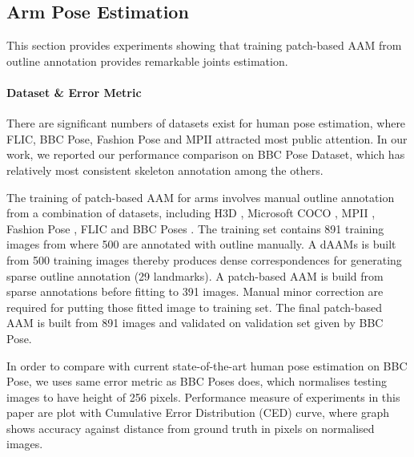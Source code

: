 \subsection{Arm Pose Estimation}
\label{exp:benchmark}
This section provides experiments showing that training patch-based AAM from outline annotation provides remarkable joints estimation.

\paragraph{Dataset \& Error Metric} There are significant numbers of datasets exist for human pose estimation, where FLIC\cite{sapp2013modec}, BBC Pose\cite{pfister2015flowing}, Fashion Pose\cite{dantone2013human} and MPII\cite{andriluka14cvpr} attracted most public attention. In our work, we reported our performance comparison on BBC Pose Dataset\cite{pfister2015flowing}, which has relatively most consistent skeleton annotation among the others.

The training of patch-based AAM for arms involves manual outline annotation from a combination of datasets, including H3D \cite{PoseletsICCV09}, Microsoft COCO \cite{lin2014microsoft}, MPII \cite{andriluka14cvpr}, Fashion Pose \cite{dantone2013human}, FLIC \cite{sapp2013modec} and BBC Poses \cite{pfister2015flowing}. The training set contains 891 training images from where 500 are annotated with outline manually. A dAAMs is built from 500 training images thereby produces dense correspondences for generating sparse outline annotation (29 landmarks). A patch-based AAM is build from sparse annotations before fitting to 391 images. Manual minor correction are required for putting those fitted image to training set. The final patch-based AAM is built from 891 images and validated on validation set given by BBC Pose.

In order to compare with current state-of-the-art human pose estimation on BBC Pose, we uses same error metric as BBC Poses does, which normalises testing images to have height of 256 pixels. Performance measure of experiments in this paper are plot with Cumulative Error Distribution (CED) curve, where graph shows accuracy against distance from ground truth in pixels on normalised images.


